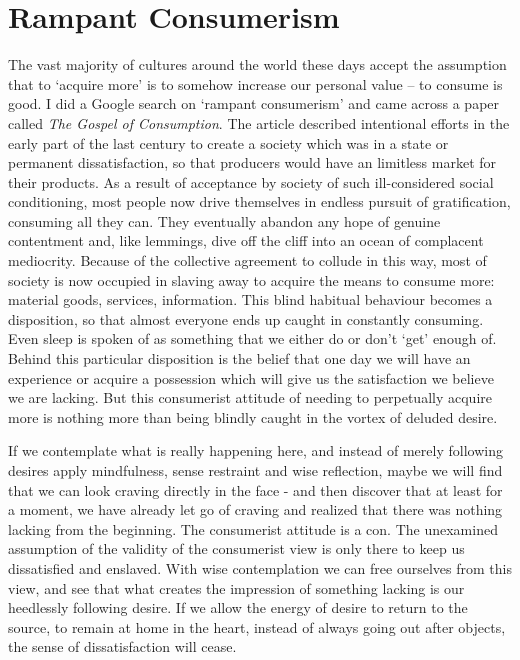 \section{Rampant Consumerism}

The vast majority of cultures around the world these days accept the
assumption that to ‘acquire more’ is to somehow increase our personal
value – to consume is good. I did a Google search on ‘rampant
consumerism’ and came across a paper called \emph{The Gospel of
Consumption}.\cite{gospel}
The article described intentional efforts in the early part of the
last century to create a society which was in a state or permanent
dissatisfaction, so that producers would have an limitless market for
their products. As a result of acceptance by society of such
ill-considered social conditioning, most people now drive themselves in
endless pursuit of gratification, consuming all they can. They
eventually abandon any hope of genuine contentment and, like lemmings,
dive off the cliff into an ocean of complacent mediocrity. Because of
the collective agreement to collude in this way, most of society is now
occupied in slaving away to acquire the means to consume more: material
goods, services, information. This blind habitual behaviour becomes a
disposition, so that almost everyone ends up caught in constantly
consuming. Even sleep is spoken of as something that we either do or
don’t ‘get’ enough of. Behind this particular disposition is the belief
that one day we will have an experience or acquire a possession which
will give us the satisfaction we believe we are lacking. But this
consumerist attitude of needing to perpetually acquire more is nothing
more than being blindly caught in the vortex of deluded desire.

If we contemplate what is really happening here, and instead of merely
following desires apply mindfulness, sense restraint and wise
reflection, maybe we will find that we can look craving directly in the
face - and then discover that at least for a moment, we have already let
go of craving and realized that there was nothing lacking from the
beginning. The consumerist attitude is a con. The unexamined assumption
of the validity of the consumerist view is only there to keep us
dissatisfied and enslaved. With wise contemplation we can free ourselves
from this view, and see that what creates the impression of something
lacking is our heedlessly following desire. If we allow the energy of
desire to return to the source, to remain at home in the heart, instead
of always going out after objects, the sense of dissatisfaction will
cease.

